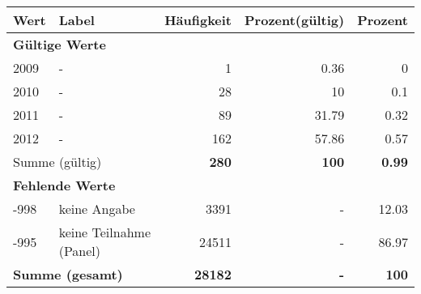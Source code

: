      \begin{longtable}{lXrrr}
     \toprule
     \textbf{Wert} & \textbf{Label} & \textbf{Häufigkeit} & \textbf{Prozent(gültig)} & \textbf{Prozent} \\
     \endhead
     \midrule
     \multicolumn{5}{l}{\textbf{Gültige Werte}}\\

     2009 &
     \multicolumn{1}{X}{ -  } &


       \num{1} &
       \num[round-mode=places,round-precision=2]{0,36} &
         \num[round-mode=places,round-precision=2]{0} \\

     2010 &
     \multicolumn{1}{X}{ -  } &


       \num{28} &
       \num[round-mode=places,round-precision=2]{10} &
         \num[round-mode=places,round-precision=2]{0,1} \\

     2011 &
     \multicolumn{1}{X}{ -  } &


       \num{89} &
       \num[round-mode=places,round-precision=2]{31,79} &
         \num[round-mode=places,round-precision=2]{0,32} \\

     2012 &
     \multicolumn{1}{X}{ -  } &


       \num{162} &
       \num[round-mode=places,round-precision=2]{57,86} &
         \num[round-mode=places,round-precision=2]{0,57} \\
     \midrule
     \multicolumn{2}{l}{Summe (gültig)} &
       \textbf{\num{280}} &
     \textbf{100} &
       \textbf{\num[round-mode=places,round-precision=2]{0,99}} \\
     \multicolumn{5}{l}{\textbf{Fehlende Werte}}\\
       -998 &
       keine Angabe &
         \num{3391} &
        - &
         \num[round-mode=places,round-precision=2]{12,03} \\
       -995 &
       keine Teilnahme (Panel) &
         \num{24511} &
        - &
         \num[round-mode=places,round-precision=2]{86,97} \\
     \midrule
     \multicolumn{2}{l}{\textbf{Summe (gesamt)}} &
          \textbf{\num{28182}} &
        \textbf{-} &
        \textbf{100} \\
     \bottomrule
     \end{longtable}
     
